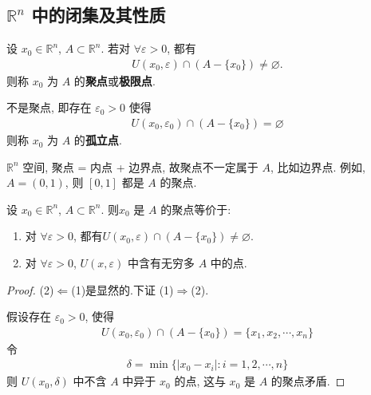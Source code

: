 \documentclass[../../main.tex]{subfiles}
\begin{document}
\subsection{$\mathbb{R}^n$ 中的闭集及其性质}

\begin{definition}[聚点、极限点和孤立点]
设 $x_0 \in \mathbb{R}^n$, $A \subset \mathbb{R}^n$. 若对 $\forall \varepsilon > 0$, 都有
\begin{align*}
U(x_0, \varepsilon) \cap (A - \{x_0\}) \neq \varnothing.
\end{align*}
则称 $x_0$ 为 $A$ 的\textbf{聚点}或\textbf{极限点}. 

不是聚点, 即存在 $\varepsilon_0 > 0$ 使得
\begin{align*}
U(x_0, \varepsilon_0) \cap (A - \{x_0\}) = \varnothing
\end{align*}
则称 $x_0$ 为 $A$ 的\textbf{孤立点}.
\end{definition}
\begin{remark}
$\mathbb{R}^n$ 空间, 聚点 = 内点 + 边界点, 故聚点不一定属于 $A$, 比如边界点. 例如, $A = (0, 1)$, 则 $[0, 1]$ 都是 $A$ 的聚点.
\end{remark}

\begin{proposition}[Rn中聚点的等价条件]\label{proposition:Rn中聚点的等价条件}
设 $x_0 \in \mathbb{R}^n$, $A \subset \mathbb{R}^n$. 则$x_0$ 是 $A$ 的聚点等价于:
\begin{enumerate}[(1)]
\item 对 $\forall \varepsilon > 0$, 都有$U(x_0, \varepsilon) \cap (A - \{x_0\}) \neq \varnothing.$

\item 对 $\forall \varepsilon > 0$, $U(x, \varepsilon)$ 中含有无穷多 $A$ 中的点.
\end{enumerate}
\end{proposition}
\begin{proof}
(2)$\Leftarrow$(1)是显然的.下证
(1)$\Rightarrow$(2).

假设存在 $\varepsilon_0 > 0$, 使得
\begin{align*}
U(x_0, \varepsilon_0) \cap (A - \{x_0\}) = \{x_1, x_2, \cdots, x_n\}
\end{align*}
令
\begin{align*}
\delta = \min\{|x_0 - x_i| : i = 1, 2, \cdots, n\}
\end{align*}
则 $U(x_0, \delta)$ 中不含 $A$ 中异于 $x_0$ 的点, 这与 $x_0$ 是 $A$ 的聚点矛盾.

\end{proof}
\end{document}
